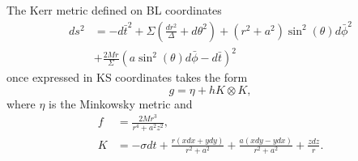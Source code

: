 \begin{lemma}
 The Kerr metric defined on \gls{BL} coordinates
 \begin{align*}
 ds^2&=-d\bar{t}^2+ \Sigma \left(\frac{dr^2}{\Delta}+d\theta^2 \right)+(r^2+a^2)\sin^2{(\theta)} d\bar{\phi}^2\\
 &+\frac{2 M r}{\Sigma}(a \sin^2{(\theta)} d \bar{\phi} -d\bar{t})^2
\end{align*}
once expressed in \gls{KS} coordinates takes the form
\begin{equation*}
 g=\eta + h K \otimes K,
\end{equation*}
where $\eta$ is the Minkowsky metric and
\begin{align*}
 f&=\frac{2 M r^3}{r^4+a^2 z^2}, \nonumber \\
 K&=-\sigma dt + \frac{r(x dx+y dy)}{r^2+a^2} + \frac{a(x dy-y dx)}{r^2+a^2}+\frac{z dz}{r}. \nonumber
\end{align*}
\end{lemma}
